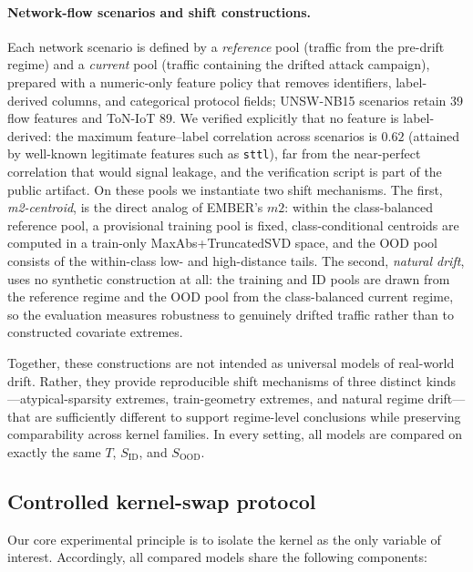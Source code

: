 \documentclass[journal]{IEEEtran}
\begin{document}
\paragraph{Network-flow scenarios and shift constructions.}
Each network scenario is defined by a \emph{reference} pool (traffic from the pre-drift regime) and a \emph{current} pool (traffic containing the drifted attack campaign), prepared with a numeric-only feature policy that removes identifiers, label-derived columns, and categorical protocol fields; UNSW-NB15 scenarios retain 39 flow features and ToN-IoT 89. We verified explicitly that no feature is label-derived: the maximum feature--label correlation across scenarios is $0.62$ (attained by well-known legitimate features such as \texttt{sttl}), far from the near-perfect correlation that would signal leakage, and the verification script is part of the public artifact. On these pools we instantiate two shift mechanisms. The first, \emph{m2-centroid}, is the direct analog of EMBER's $m2$: within the class-balanced reference pool, a provisional training pool is fixed, class-conditional centroids are computed in a train-only MaxAbs+TruncatedSVD space, and the OOD pool consists of the within-class low- and high-distance tails. The second, \emph{natural drift}, uses no synthetic construction at all: the training and ID pools are drawn from the reference regime and the OOD pool from the class-balanced current regime, so the evaluation measures robustness to genuinely drifted traffic rather than to constructed covariate extremes.

Together, these constructions are not intended as universal models of real-world drift. Rather, they provide reproducible shift mechanisms of three distinct kinds---atypical-sparsity extremes, train-geometry extremes, and natural regime drift---that are sufficiently different to support regime-level conclusions while preserving comparability across kernel families. In every setting, all models are compared on exactly the same $T$, $S_{\mathrm{ID}}$, and $S_{\mathrm{OOD}}$.

\subsection{Controlled kernel-swap protocol}

Our core experimental principle is to isolate the kernel as the only variable of interest. Accordingly, all compared models share the following components:
\end{document}
